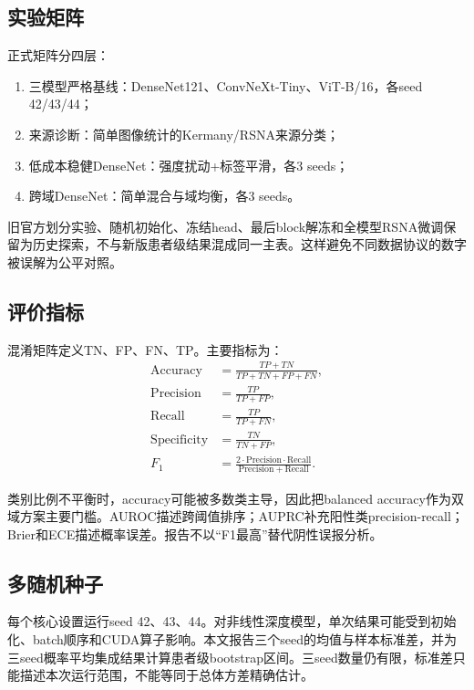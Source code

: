 \subsection{实验矩阵}

正式矩阵分四层：

\begin{enumerate}
  \item 三模型严格基线：DenseNet121、ConvNeXt-Tiny、ViT-B/16，各seed 42/43/44；
  \item 来源诊断：简单图像统计的Kermany/RSNA来源分类；
  \item 低成本稳健DenseNet：强度扰动+标签平滑，各3 seeds；
  \item 跨域DenseNet：简单混合与域均衡，各3 seeds。
\end{enumerate}

旧官方划分实验、随机初始化、冻结head、最后block解冻和全模型RSNA微调保留为历史探索，不与新版患者级结果混成同一主表。这样避免不同数据协议的数字被误解为公平对照。

\subsection{评价指标}

混淆矩阵定义TN、FP、FN、TP。主要指标为：
\begin{align}
\mathrm{Accuracy}&=\frac{TP+TN}{TP+TN+FP+FN},\\
\mathrm{Precision}&=\frac{TP}{TP+FP},\\
\mathrm{Recall}&=\frac{TP}{TP+FN},\\
\mathrm{Specificity}&=\frac{TN}{TN+FP},\\
F_1&=\frac{2\cdot\mathrm{Precision}\cdot\mathrm{Recall}}{\mathrm{Precision}+\mathrm{Recall}}.
\end{align}

类别比例不平衡时，accuracy可能被多数类主导，因此把balanced accuracy作为双域方案主要门槛。AUROC描述跨阈值排序；AUPRC补充阳性类precision-recall；Brier和ECE描述概率误差。报告不以“F1最高”替代阴性误报分析。

\subsection{多随机种子}

每个核心设置运行seed 42、43、44。对非线性深度模型，单次结果可能受到初始化、batch顺序和CUDA算子影响。本文报告三个seed的均值与样本标准差，并为三seed概率平均集成结果计算患者级bootstrap区间。三seed数量仍有限，标准差只能描述本次运行范围，不能等同于总体方差精确估计。


